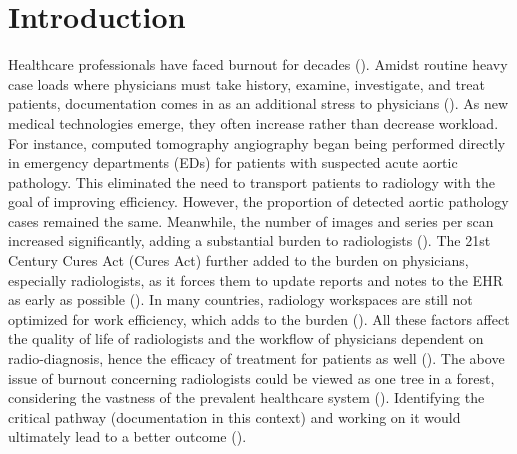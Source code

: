 \section{Introduction}
\label{sec:intro} 
Healthcare professionals have faced burnout for decades (\cite{marzanoDiagnosingOvercrowdedEmergency2024,batandaPrevalenceBurnoutHealthcare2024,bolatovOccupationalBurnoutHealthcare2025,tangBurnoutStressNew2025,haldaneHealthSystemsResilience2021,arsenaultCOVID19ResilienceHealthcare2022}).
Amidst routine heavy case loads where physicians must take history, examine, investigate, and treat patients, documentation comes in as an additional stress to physicians (\cite{preiksaitisChatGPTNotSolution2023,levyDefiningDocumentationBurden2024,muradMeasuringDocumentationBurden2024}).
As new medical technologies emerge, they often increase rather than decrease workload.
For instance, computed tomography angiography began being performed directly in emergency departments (EDs) for patients with suspected acute aortic pathology.
This eliminated the need to transport patients to radiology with the goal of improving efficiency.
However, the proportion of detected aortic pathology cases remained the same.
Meanwhile, the number of images and series per scan increased significantly, adding a substantial burden to radiologists (\cite{kanzariaEmergencyPhysicianPerceptions2015,sokolovskayaEffectFasterReporting2015,pourvaziriImagingInformationOverload2022,brulsWorkloadRadiologistsOncall2020,danlantsmanTrendRadiologistWorkload2022}).
The 21st Century Cures Act (Cures Act) further added to the burden on physicians, especially radiologists, as it forces them to update reports and notes to the EHR as early as possible (\cite{mehanImmediateRadiologyReport2022,choudhryEnhancedReadabilityDischarge2019}).
In many countries, radiology workspaces are still not optimized for work efficiency, which adds to the burden (\cite{hillmanRadiologistsBurdenInefficiency2013,krupinskiLongRadiologyWorkdays2010}). 
All these factors affect the quality of life of radiologists and the workflow of physicians dependent on radio-diagnosis, hence the efficacy of treatment for patients as well (\cite{atwalHealthIssuesRadiologists2017,groverPsychologicalProblemsBurnout2018}).
The above issue of burnout concerning radiologists could be viewed as one tree in a forest, considering the vastness of the prevalent healthcare system (\cite{rotensteinPrevalenceBurnoutPhysicians2018}).
Identifying the critical pathway (documentation in this context) and working on it would ultimately lead to a better outcome (\cite{everyCriticalPathwaysReview2000}).
